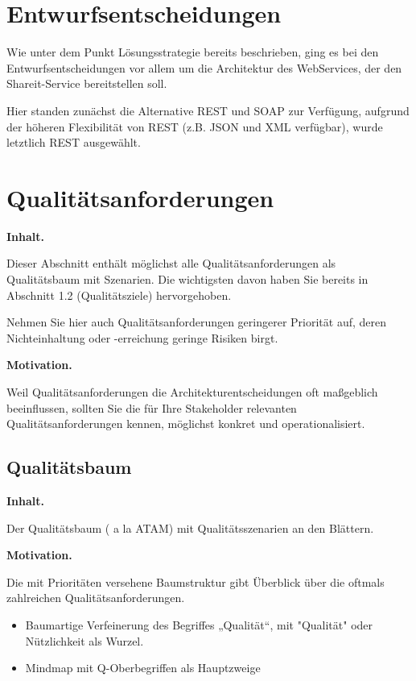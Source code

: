 \documentclass[]{article}
\begin{document}
\section{Entwurfsentscheidungen}\label{section-design-decisions}

Wie unter dem Punkt Lösungsstrategie bereits beschrieben, ging es bei den Entwurfsentscheidungen vor allem um die Architektur des WebServices, der den Shareit-Service bereitstellen soll.

Hier standen zunächst die Alternative REST und SOAP zur Verfügung, aufgrund der höheren Flexibilität von REST (z.B. JSON und XML verfügbar), wurde letztlich REST ausgewählt.




\section{Qualitätsanforderungen}\label{section-quality-scenarios}

\textbf{Inhalt.}

Dieser Abschnitt enthält möglichst alle Qualitätsanforderungen als
Qualitätsbaum mit Szenarien. Die wichtigsten davon haben Sie bereits in
Abschnitt 1.2 (Qualitätsziele) hervorgehoben.

Nehmen Sie hier auch Qualitätsanforderungen geringerer Priorität auf,
deren Nichteinhaltung oder -erreichung geringe Risiken birgt.

\textbf{Motivation.}

Weil Qualitätsanforderungen die Architekturentscheidungen oft maßgeblich
beeinflussen, sollten Sie die für Ihre Stakeholder relevanten
Qualitätsanforderungen kennen, möglichst konkret und operationalisiert.

\subsection{Qualitätsbaum}\label{_qualit_tsbaum}

\textbf{Inhalt.}

Der Qualitätsbaum ( a la ATAM) mit Qualitätsszenarien an den Blättern.

\textbf{Motivation.}

Die mit Prioritäten versehene Baumstruktur gibt Überblick über die
oftmals zahlreichen Qualitätsanforderungen.

\begin{itemize}
\item
  Baumartige Verfeinerung des Begriffes „Qualität``, mit "Qualität" oder
  Nützlichkeit als Wurzel.
\item
  Mindmap mit Q-Oberbegriffen als Hauptzweige
\end{itemize}
\end{document}
